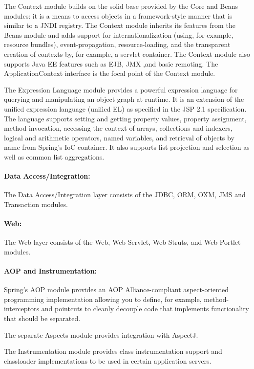 The Context module builds on the solid base provided by the Core and Beans modules: it is a means
to access objects in a framework-style manner that is similar to a JNDI registry. The Context module
inherits its features from the Beans module and adds support for internationalization (using, for example,
resource bundles), event-propagation, resource-loading, and the transparent creation of contexts by,
for example, a servlet container. The Context module also supports Java EE features such as EJB,
JMX ,and basic remoting. The ApplicationContext interface is the focal point of the Context module.

The Expression Language module provides a powerful expression language for querying and
manipulating an object graph at runtime. It is an extension of the unified expression language (unified
EL) as specified in the JSP 2.1 specification. The language supports setting and getting property values,
property assignment, method invocation, accessing the context of arrays, collections and indexers,
logical and arithmetic operators, named variables, and retrieval of objects by name from Spring's IoC
container. It also supports list projection and selection as well as common list aggregations.

\paragraph{Data Access/Integration:}
The Data Access/Integration layer consists of the JDBC, ORM, OXM, JMS and Transaction modules.

\paragraph{Web:} The Web layer consists of the Web, Web-Servlet, Web-Struts, and Web-Portlet modules.

\paragraph{AOP and Instrumentation:} Spring's AOP module provides an AOP Alliance-compliant aspect-oriented programming
implementation allowing you to define, for example, method-interceptors and pointcuts to cleanly
decouple code that implements functionality that should be separated. 

The separate Aspects module provides integration with AspectJ.

The Instrumentation module provides class instrumentation support and classloader implementations
to be used in certain application servers.

